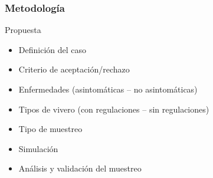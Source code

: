 \documentclass[10.5pt]{beamer}
\begin{document}
\begin{frame}
\frametitle{Metodología}
\begin{block}{Propuesta}
\begin{itemize}
\item Definición del caso
\item Criterio de aceptación/rechazo
\item Enfermedades (asintomáticas – no asintomáticas)
\item Tipos de vivero (con regulaciones – sin regulaciones)
\item Tipo de muestreo
\item Simulación
\item Análisis y validación del muestreo
\end{itemize}
\end{block}
\end{frame}


  
\end{document}
